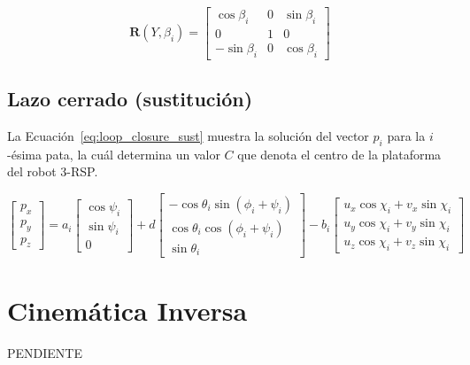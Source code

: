 \documentclass[titlepage, letterpaper, fleqn]{article}
\let\bs\mathbf
\begin{document}
\begin{equation}
    \label{eq:rot_Y_beta}
    \bs{R}(Y,\beta_i) =
    \begin{bmatrix}
    \cos\beta_i & 0 & \sin\beta_i \\
    0 & 1 & 0 \\
    -\sin\beta_i & 0 &\cos\beta_i
    \end{bmatrix}
\end{equation}


\subsection{Lazo cerrado (sustitución)} %
\label{sec:loop_closure_sust}

La Ecuación~\ref{eq:loop_closure_sust} muestra la solución del vector $p_i$ para la $i$-ésima pata,
la cuál determina un valor $C$ que denota el centro de la plataforma del robot 3-RSP.

\begin{equation}
    \label{eq:loop_closure_sust}
    \begin{bmatrix}
    p_x \\
    p_y \\
    p_z
    \end{bmatrix}
    =a_i
    \begin{bmatrix}
    \cos\psi_i \\
    \sin\psi_i \\
    0
    \end{bmatrix}
    +d
    \begin{bmatrix}
    -\cos \theta_i \sin(\phi_i + \psi_i) \\
    \cos \theta_i \cos(\phi_i + \psi_i) \\
    \sin \theta_i
    \end{bmatrix}
    -b_i
    \begin{bmatrix}
    u_x \cos\chi_i + v_x \sin\chi_i \\
    u_y \cos\chi_i + v_y \sin\chi_i \\
    u_z \cos\chi_i + v_z \sin\chi_i
    \end{bmatrix}
\end{equation}


\section{Cinemática Inversa} %
\label{sec:inverse}

PENDIENTE









\end{document}
